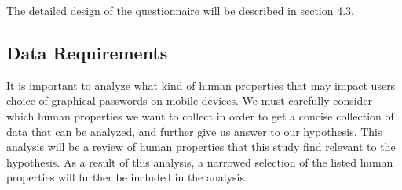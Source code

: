     The detailed design of the questionnaire will be described in section 4.3.

  \subsection{Data Requirements}
  
  It is important to analyze what kind of human properties that may impact users choice of graphical passwords on mobile devices. We must carefully consider which human properties we want to collect in order to get a concise collection of data that can be analyzed, and further give us answer to our hypothesis. This analysis will be a review of human properties that this study find relevant to the hypothesis. As a result of this analysis, a narrowed selection of the listed human properties will further be included in the analysis.  

